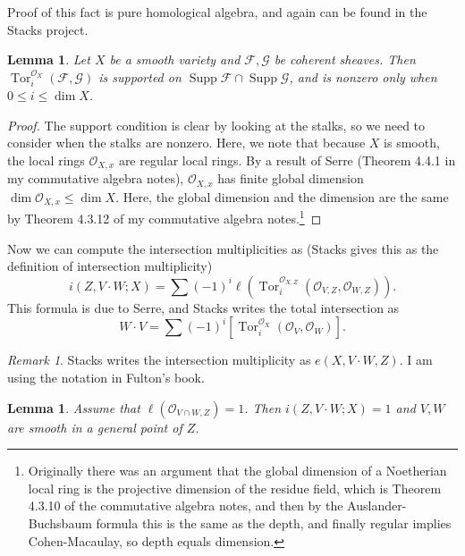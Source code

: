 \documentclass{amsart}
\newtheorem{lem}[thm]{Lemma}
\theoremstyle{definition}
\theoremstyle{remark}
\newtheorem{rmk}[thm]{Remark}
\theoremstyle{plain}
\theoremstyle{definition}
\theoremstyle{remark}
\newcommand{\msc}[1]{\mathscr{#1}}
\DeclareMathOperator{\Tor}{Tor}
\DeclareMathOperator{\Supp}{Supp}
\begin{document}
Proof of this fact is pure homological algebra, and again can be found in the Stacks project.

\begin{lem}
    Let $X$ be a smooth variety and $\msc{F}, \msc{G}$ be coherent sheaves. Then $\Tor_i^{\msc{O}_X}(\msc{F}, \msc{G})$ is supported on $\Supp \msc{F} \cap \Supp \msc{G}$, and is nonzero only when $0 \leq i \leq \dim X$.
\end{lem}

\begin{proof}
    The support condition is clear by looking at the stalks, so we need to consider when the stalks are nonzero. Here, we note that because $X$ is smooth, the local rings $\msc{O}_{X,x}$ are regular local rings. By a result of Serre (Theorem 4.4.1 in my commutative algebra notes), $\msc{O}_{X,x}$ has finite global dimension $\dim \msc{O}_{X,x} \leq \dim X$. Here, the global dimension and the dimension are the same by Theorem 4.3.12 of my commutative algebra notes.\footnote{Originally there was an argument that the global dimension of a Noetherian local ring is the projective dimension of the residue field, which is Theorem 4.3.10 of the commutative algebra notes, and then by the Auslander-Buchsbaum formula this is the same as the depth, and finally regular implies Cohen-Macaulay, so depth equals dimension.}
\end{proof}

Now we can compute the intersection multiplicities as (Stacks gives this as the definition of intersection multiplicity)
\[ i(Z, V \cdot W; X) = \sum {(-1)}^i \ell( \Tor_i^{\msc{O}_{X,Z}} (\msc{O}_{V,Z}, \msc{O}_{W,Z}) ). \]
This formula is due to Serre, and Stacks writes the total intersection as
\[ W \cdot V = \sum {(-1)}^i [\Tor_i^{\msc{O}_X}(\msc{O}_V, \msc{O}_W)]. \]
\begin{rmk}
    Stacks writes the intersection multiplicity as $e(X, V \cdot W, Z)$. I am using the notation in Fulton's book.
\end{rmk}

\begin{lem}
    Assume that $\ell(\msc{O}_{V \cap W, Z}) = 1$. Then $i(Z, V \cdot W; X) = 1$ and $V, W$ are smooth in a general point of $Z$.
\end{lem}
\end{document}
